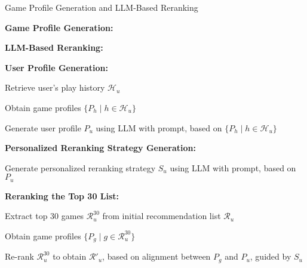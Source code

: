 \begin{algorithm}[htbp]
\caption{Game Profile Generation and LLM-Based Reranking}
\label{alg:reranking}
\DontPrintSemicolon
{}



\BlankLine

\textbf{Game Profile Generation:}


\BlankLine
\textbf{LLM-Based Reranking:}

\textbf{User Profile Generation:}

Retrieve user's play history $\mathcal{H}_u$\;

Obtain game profiles $\{P_h \mid h \in \mathcal{H}_u\}$\;

Generate user profile $P_u$ using LLM with prompt, based on $\{P_h \mid h \in \mathcal{H}_u\}$\;

\BlankLine
\textbf{Personalized Reranking Strategy Generation:}

Generate personalized reranking strategy $S_u$ using LLM with prompt, based on $P_u$\;

\BlankLine
\textbf{Reranking the Top 30 List:}

Extract top 30 games $\mathcal{R}_u^{30}$ from initial recommendation list $\mathcal{R}_u$\;

Obtain game profiles $\{P_g \mid g \in \mathcal{R}_u^{30}\}$\;

Re-rank $\mathcal{R}_u^{30}$ to obtain $\mathcal{R}'_u$, based on alignment between $P_g$ and $P_u$, guided by $S_u$\;
\end{algorithm}
